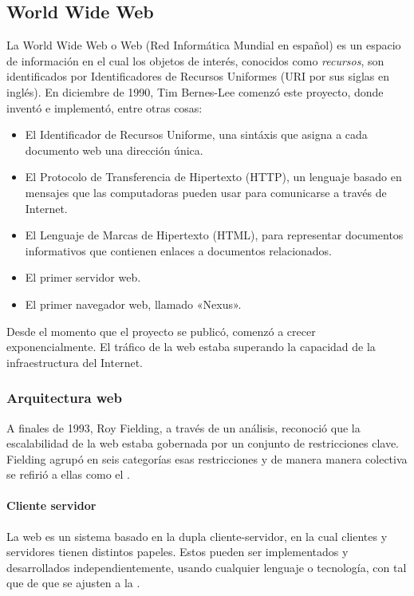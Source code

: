 \begin{description}
\end{description}


\subsection{World Wide Web}
\label{\detokenize{chapter_one/rest:world-wide-web}}
La World Wide Web o Web (Red Informática Mundial en español)  es un espacio de
información en el cual los objetos de interés, conocidos como \textit{recursos},
son identificados por Identificadores de Recursos Uniformes (URI por sus
siglas en inglés). En diciembre de 1990, Tim Bernes-Lee comenzó este proyecto,
donde inventó e implementó, entre otras cosas:
\begin{itemize}
\item {} 
El Identificador de Recursos Uniforme, una sintáxis que asigna a cada documento web una dirección única.

\item {} 
El Protocolo de Transferencia de Hipertexto (HTTP), un lenguaje basado en mensajes que las computadoras pueden usar para comunicarse a través de Internet.

\item {} 
El Lenguaje de Marcas de Hipertexto (HTML), para representar documentos informativos que contienen enlaces a documentos relacionados.

\item {} 
El primer servidor web.

\item {} 
El primer navegador web, llamado «Nexus».

\end{itemize}

Desde el momento que el proyecto se publicó, comenzó a crecer exponencialmente.
El tráfico de la web estaba superando la capacidad de la infraestructura del Internet.


\subsubsection{Arquitectura web}
\label{\detokenize{chapter_one/rest:arquitectura-web}}
A finales de 1993, Roy Fielding, a través de un análisis, reconoció que la escalabilidad
de la web estaba gobernada por un conjunto de restricciones clave.
Fielding agrupó en seis categorías esas restricciones y de manera manera colectiva
se refirió a ellas como el .


\paragraph{Cliente servidor}
\label{\detokenize{chapter_one/rest:cliente-servidor}}
La web es un sistema basado en la dupla cliente-servidor, en la cual clientes y servidores
tienen distintos papeles. Estos pueden ser implementados y desarrollados independientemente,
usando cualquier lenguaje o tecnología, con tal que de que se ajusten a la .


